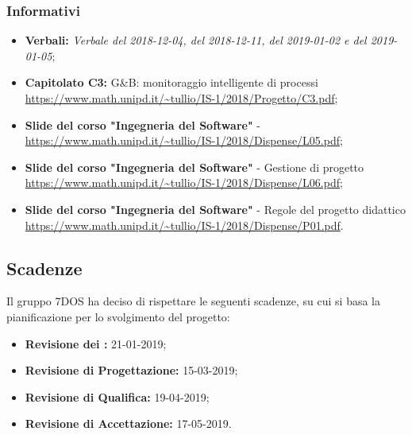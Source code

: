 \subsubsection{Informativi}
\begin{itemize}
	\item \textbf{Verbali:} \emph{Verbale del 2018-12-04, del 2018-12-11, del 2019-01-02 e del 2019-01-05};
	\item \textbf{Capitolato C3:} G\&B: monitoraggio intelligente di processi 
 \\ \url{https://www.math.unipd.it/~tullio/IS-1/2018/Progetto/C3.pdf};
 	\item \textbf{Slide del corso "Ingegneria del Software"} - 
 \\ \url{https://www.math.unipd.it/~tullio/IS-1/2018/Dispense/L05.pdf};
	\item \textbf{Slide del corso "Ingegneria del Software"} - Gestione di progetto
 \\ \url{https://www.math.unipd.it/~tullio/IS-1/2018/Dispense/L06.pdf};
 	\item \textbf{Slide del corso "Ingegneria del Software"} - Regole del progetto didattico
 \\ \url{https://www.math.unipd.it/~tullio/IS-1/2018/Dispense/P01.pdf}.
 
\end{itemize}

\subsection{Scadenze}
Il gruppo 7DOS ha deciso di rispettare le seguenti scadenze, su cui si basa la pianificazione per lo svolgimento del progetto:
\begin{itemize}
	\item \textbf{Revisione dei :} 21-01-2019;
	\item \textbf{Revisione di Progettazione:} 15-03-2019;
	\item \textbf{Revisione di Qualifica:} 19-04-2019;
	\item \textbf{Revisione di Accettazione:} 17-05-2019.
\end{itemize}

\pagebreak
